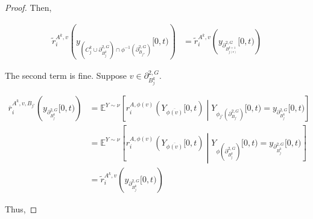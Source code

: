 \documentclass[12pt]{article}
\newcommand{\mb}{\mathbb}
\newcommand{\ov}{\overline}
\newcommand{\exmu}[2]{\mb{E}^{#1}\left[#2\right]}	%
\newcommand{\dgneigh}[2]{\partial^{2,#1}_{#2}}		%
\newcommand{\cl}[1]{\ov{#1}}						%
\newcommand{\indx}[1]{^{#1}}						%
\newcommand{\rate}{r}								%
\newcommand{\vind}[1]{_{#1}}						%
\newcommand{\tmi}[1]{#1}							%
\newcommand{\stpara}[1]{_{#1}}						%
\newcommand{\gvpara}[2]{^{#1,#2}}					%
\newcommand{\Xg}{Y}									%
\newcommand{\brate}{\alt{\rate}}					%
\newcommand{\alt}[1]{\tilde{#1}}					%
\newcommand{\mm}{\nu}								%
\newcommand{\bgrate}{\ov{\rate}}					%
\newcommand{\xg}{y}									%
\newcommand{\gvjpara}[3]{^{#1,#2,#3}}				%
\begin{document}
\begin{proof}
Then, 

\begin{align*}
\brate\gvpara{A\indx{k}}{v}\stpara{i}\left(\xg\vind{\left(C_j\indx{k}\cup\dgneigh{G}{B_j\indx{k}}\right)\cap\phi^{-1}(\dgneigh{G}{B_{j''}})}\tmi{[0,t)}\right) &= \brate\gvpara{A\indx{k}}{v}\stpara{i}\left(\xg\vind{\dgneigh{G}{B_{j(v)}\indx{k+1}}}\tmi{[0,t)}\right)
\end{align*}

The second term is fine. Suppose \(v \in \dgneigh{G}{B_j\indx{k}}\).

\begin{align*}
\bgrate\gvjpara{A\indx{k}}{v}{B_{j'}}\stpara{i}\left(\xg\vind{\dgneigh{G}{B_j\indx{k}}}\tmi{[0,t)}\right) &= \exmu{\Xg\sim\mm}{\rate\gvpara{A}{\phi(v)}\stpara{i}(\Xg\vind{\cl{\phi(v)}}\tmi{[0,t)}\middle|\Xg\vind{\phi_{j'}(\dgneigh{G}{B_{j'}})}\tmi{[0,t)} = \xg\vind{\dgneigh{G}{B_j\indx{k}}}\tmi{[0,t)}}\\
&= \exmu{\Xg\sim\mm}{\rate\gvpara{A}{\phi(v)}\stpara{i}(\Xg\vind{\cl{\phi(v)}}\tmi{[0,t)}\middle|\Xg\vind{\phi(\dgneigh{G}{B_j\indx{k}})}\tmi{[0,t)} = \xg\vind{\dgneigh{G}{B_j\indx{k}}}\tmi{[0,t)}}\\
&= \brate\gvpara{A\indx{k}}{v}\stpara{i}\left(\xg\vind{\dgneigh{G}{B_j\indx{k}}}\tmi{[0,t)}\right)
\end{align*}

Thus,


\end{proof}
\end{document}

